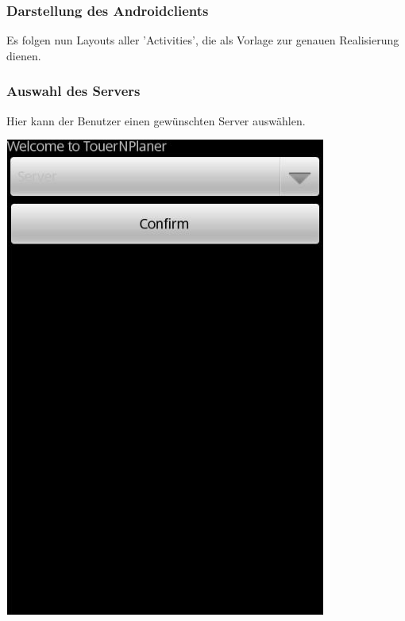 \documentclass[a4paper,10pt,titlepage]{article}
\begin{document}
\subsubsection{Darstellung des Androidclients}
Es folgen nun Layouts aller 'Activities', die als Vorlage zur genauen Realisierung dienen.

\subsubsection{Auswahl des Servers}
Hier kann der Benutzer einen gewünschten Server auswählen.
\begin {center}
\includegraphics[scale=0.40]{media/android/server.jpg}
\end {center}
\end{document}
